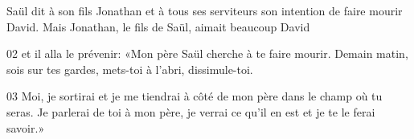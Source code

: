 Saül dit à son fils Jonathan et à tous ses serviteurs son intention de faire mourir David. Mais Jonathan, le fils de Saül, aimait beaucoup David

02 et il alla le prévenir: «Mon père Saül cherche à te faire mourir. Demain matin, sois sur tes gardes, mets-toi à l’abri, dissimule-toi.

03 Moi, je sortirai et je me tiendrai à côté de mon père dans le champ où tu seras. Je parlerai de toi à mon père, je verrai ce qu’il en est et je te le ferai savoir.»